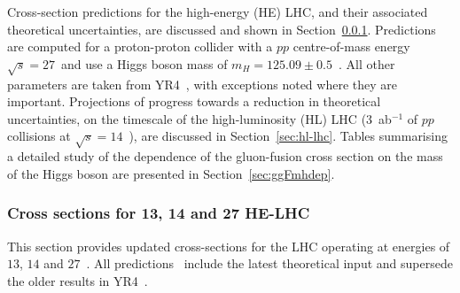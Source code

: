 %
%
%
Cross-section predictions for the high-energy (HE) LHC, and their associated theoretical uncertainties, are discussed and shown in
Section~\ref{sec:he-lhc}. Predictions are computed for a proton-proton collider with a $pp$ centre-of-mass
energy $\sqrt{s}=27$~\UTeV and use a Higgs
boson mass of $m_H=125.09 \pm 0.5$~\UGeV.   All other parameters are taken from YR4~\cite{deFlorian:2016spz},
with exceptions noted where they are important.  
Projections of progress towards a reduction in theoretical uncertainties, on the timescale
of the high-luminosity (HL) LHC (3~ab$^{-1}$ of $pp$ collisions at $\sqrt{s}=14$~\UTeV), are discussed in Section~\ref{sec:hl-lhc}. 
Tables summarising a detailed study of the dependence of the gluon-fusion cross section on the mass of the Higgs boson
are presented in Section~\ref{sec:ggFmhdep}.

\subsubsection{Cross sections for 13, 14 and 27 \UTeV HE-LHC}
\label{sec:he-lhc}

This section provides updated cross-sections for the LHC operating at
energies of $13$, $14$ and $27$~\UTeV. All predictions~\cite{HXSWGwiki} include the latest 
theoretical input and supersede the older results in YR4~\cite{deFlorian:2016spz}.

